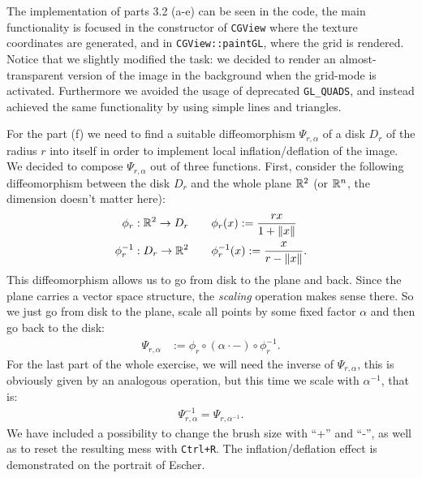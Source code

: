 \documentclass{scrartcl}
\newcommand{\exercise}[2]{\vspace{1em}\noindent{\bf Exercise #1 (#2)}}
\begin{document}
\hfill 
{\footnotesize }
\newline
{\footnotesize }

\noindent\hrulefill

\exercise{3.2}{Texture mapping}
The implementation of parts 3.2 (a-e) can be seen in the code, 
the main functionality is focused in the constructor of \verb|CGView|
where the texture coordinates are generated, and in \verb|CGView::paintGL|,
where the grid is rendered. Notice that we slightly modified the task:
we decided to render an almost-transparent version of the image in the 
background when the grid-mode is activated. Furthermore we avoided the
usage of deprecated \verb|GL_QUADS|, and instead achieved the same 
functionality by using simple lines and triangles.

For the part (f) we need to find a suitable diffeomorphism $\Psi_{r, \alpha}$ 
of a disk $D_r$ of the radius $r$ into itself in order to implement 
local inflation/deflation of the image. 
We decided to compose 
$\Psi_{r, \alpha}$ out of three functions. 
First, consider the following diffeomorphism between the
disk $D_r$ and the whole plane $\mathbb{R}^2$ (or $\mathbb{R}^n$, the dimension doesn't 
matter here):
\begin{align*}
  \phi_r: \mathbb{R}^2 \to D_r       \qquad & \phi_r(x) := \frac{rx}{1 + \left\lVert x\right\rVert} \\
  \phi_r^{-1}:  D_r \to \mathbb{R}^2 \qquad & \phi_r^{-1}(x)  := \frac{x}{r - \left\lVert x\right\rVert}.
\end{align*}
This diffeomorphism allows us to go from disk to the plane and back.
Since the plane carries a vector space structure, the \emph{scaling} operation
makes sense there. So we just go from disk to the plane, scale all points by
some fixed factor $\alpha$ and then go back to the disk:
\begin{align*}
  \Psi_{r, \alpha} & := \phi_r\circ(\alpha \cdot -) \circ \phi_r^{-1}.
\end{align*}
For the last part of the whole exercise, we will need the inverse of $\Psi_{r, \alpha}$,
this is obviously given by an analogous operation, 
but this time we scale with $\alpha^{-1}$, that is:
\begin{align*}
  \Psi_{r, \alpha}^{-1} = \Psi_{r, \alpha^{-1}}.
\end{align*}
We have included a possibility to change the brush size with ``+'' and ``-'', as
well as to reset the resulting mess with \verb|Ctrl+R|.
The inflation/deflation effect is demonstrated on the portrait of Escher.
\end{document}
